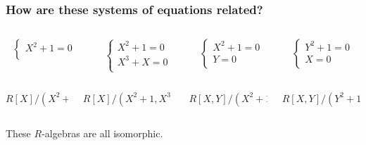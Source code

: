\documentclass[aspectratio=1610]{beamer}
\begin{document}
\begin{frame}
  \frametitle{How are these systems of equations related?}

  \begin{columns}
    \begin{column}{0.25\textwidth}
      \[\begin{cases}
        X^2 + 1 = 0\\
      \end{cases}\]
    \end{column}
    \begin{column}{0.25\textwidth}
      \[\begin{cases}
        X^2 + 1 = 0\\
        X^3 + X = 0\\
      \end{cases}\]
    \end{column}
    \begin{column}{0.25\textwidth}
      \[\begin{cases}
        X^2 + 1 = 0\\
        Y = 0\\
      \end{cases}\]
    \end{column}
    \begin{column}{0.25\textwidth}
      \[\begin{cases}
        Y^2 + 1 = 0\\
        X = 0\\
      \end{cases}\]
    \end{column}
  \end{columns}
  \pause%
  \begin{columns}
    \begin{column}{0.25\textwidth}
      \[ R[X]/(X^2+1) \]
      \[\]
    \end{column}
    \begin{column}{0.25\textwidth}
      \[\]
      \[ R[X]/(X^2+1, X^3+X) \]
    \end{column}
    \begin{column}{0.25\textwidth}
      \[ R[X, Y]/(X^2+1, Y) \]
      \[\]
    \end{column}
    \begin{column}{0.25\textwidth}
      \[\]
      \[ R[X, Y]/(Y^2+1, X) \]
    \end{column}
  \end{columns}

  \bigskip
  \bigskip
  These $R$-algebras are all isomorphic.
\end{frame}
\end{document}
